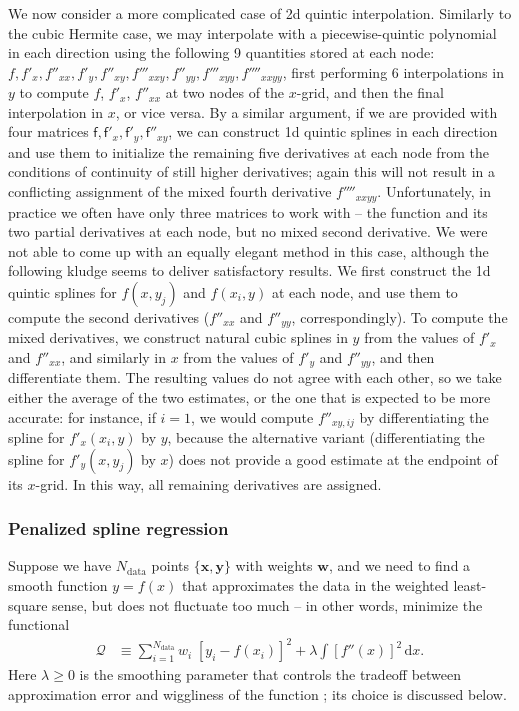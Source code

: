 \documentclass[12pt]{article}
\renewcommand{\d}{\mathrm{d}}
\newcommand{\bx}{\boldsymbol{x}}
\newcommand{\by}{\boldsymbol{y}}
\begin{document}
We now consider a more complicated case of 2d quintic interpolation. Similarly to the cubic Hermite case, we may interpolate with a piecewise-quintic polynomial in each direction using the following 9 quantities stored at each node: $f, f'_x, f''_{xx}, f'_y, f''_{xy}, f'''_{xxy}, f''_{yy}, f'''_{xyy}, f''''_{xxyy}$, first performing 6 interpolations in $y$ to compute $f$, $f'_x$, $f''_{xx}$ at two nodes of the $x$-grid, and then the final interpolation in $x$, or vice versa.
By a similar argument, if we are provided with four matrices $\mathsf{f}, \mathsf{f}'_x, \mathsf{f}'_y, \mathsf{f}''_{xy}$, we can construct 1d quintic splines in each direction and use them to initialize the remaining five derivatives at each node from the conditions of continuity of still higher derivatives; again this will not result in a conflicting assignment of the mixed fourth derivative $f''''_{xxyy}$. Unfortunately, in practice we often have only three matrices to work with -- the function and its two partial derivatives at each node, but no mixed second derivative. We were not able to come up with an equally elegant method in this case, although the following kludge seems to deliver satisfactory results. We first construct the 1d quintic splines for $f(x, y_j)$ and $f(x_i, y)$ at each node, and use them to compute the second derivatives ($f''_{xx}$ and $f''_{yy}$, correspondingly). To compute the mixed derivatives, we construct natural cubic splines in $y$ from the values of $f'_x$ and $f''_{xx}$, and similarly in $x$ from the values of $f'_y$ and $f''_{yy}$, and then differentiate them. The resulting values do not agree with each other, so we take either the average of the two estimates, or the one that is expected to be more accurate: for instance, if $i=1$, we would compute $f''_{xy,ij}$ by differentiating the spline for $f'_x(x_i,y)$ by $y$, because the alternative variant (differentiating the spline for $f'_y(x,y_j)$ by $x$) does not provide a good estimate at the endpoint of its $x$-grid. In this way, all remaining derivatives are assigned.


\subsubsection{Penalized spline regression}  \label{sec:MathSplineApproxDetails}

Suppose we have $N_\mathrm{data}$ points $\{\bx, \by\}$ with weights $\boldsymbol{w}$, and we need to find a smooth function $y=f(x)$ that approximates the data in the weighted least-square sense, but does not fluctuate too much -- in other words, minimize the functional
\begin{align}  \label{eq:ObjectiveSplineFit}
\mathcal{Q} &\equiv \sum_{i=1}^{N_\mathrm{data}} w_i\;\left[y_i - f(x_i)\right]^2 + \lambda \int \left[f''(x)\right]^2 \,\d x .
\end{align}
Here $\lambda\ge 0$ is the smoothing parameter that controls the tradeoff between approximation error and wiggliness of the function \cite{GreenSilverman}; its choice is discussed below.
\end{document}
